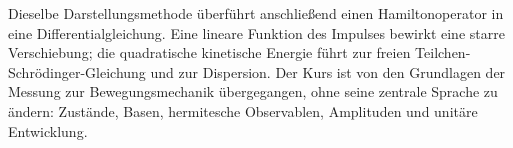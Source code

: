 Dieselbe Darstellungsmethode überführt anschließend einen Hamiltonoperator in eine Differentialgleichung. Eine lineare Funktion des Impulses bewirkt eine starre Verschiebung; die quadratische kinetische Energie führt zur freien Teilchen-Schr\"odinger-Gleichung und zur Dispersion. Der Kurs ist von den Grundlagen der Messung zur Bewegungsmechanik übergegangen, ohne seine zentrale Sprache zu ändern: Zustände, Basen, hermitesche Observablen, Amplituden und unitäre Entwicklung.

